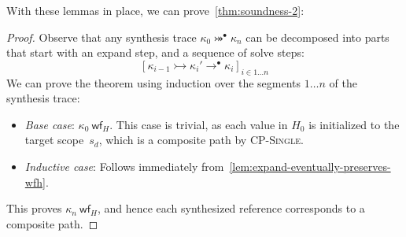 With these lemmas in place, we can prove~\cref{thm:soundness-2}:
\begin{proof}
  Observe that any synthesis trace $\kappa_0 \twoheadrightarrowtail^{\bullet} \kappa_n$ can be decomposed into parts that start with an expand step, and a sequence of solve steps:
  \[
    \left[\kappa_{i-1} \rightarrowtail \kappa_i' \rightarrow^{\bullet} \kappa_i  \right]_{i \in 1\ldots n}
  \]
  We can prove the theorem using induction over the segments $1 \ldots n$ of the synthesis trace:
  \begin{itemize}
    \item \textit{Base case}: $ \kappa_0 \ \mathsf{wf}_{H}$.
        This case is trivial, as each value in $H_0$ is initialized to the target scope~$s_d$, which is a composite path by \textsc{CP-Single}.
    \item \textit{Inductive case}: Follows immediately from~\cref{lem:expand-eventually-preserves-wfh}.
  \end{itemize}
  This proves $\kappa_n \ \mathsf{wf}_{H}$, and hence each synthesized reference corresponds to a composite path.
\end{proof}
